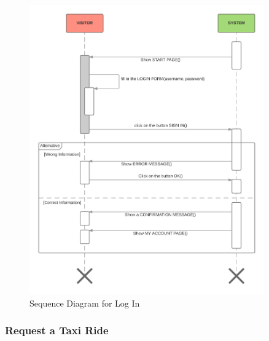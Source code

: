 \begin{figure}[htbp]
\centering
\includegraphics[width=0.9\textwidth]{cpt/img/SequenceLogin}
\caption{Sequence Diagram for Log In}
\end{figure}
\clearpage

\subsubsection{Request a Taxi Ride}

